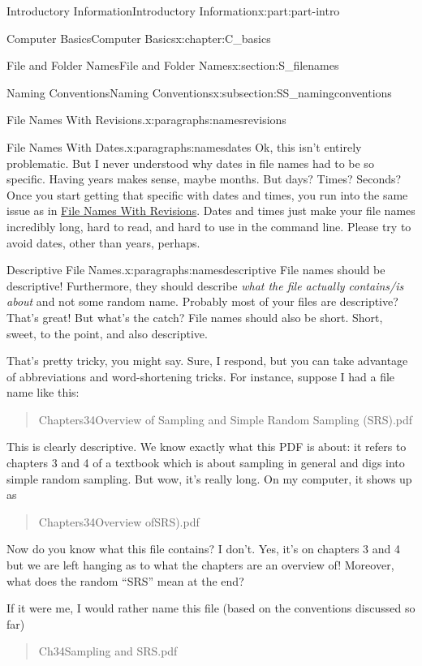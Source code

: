 \documentclass[oneside,10pt,]{book}
\begin{document}
\begin{partptx}{Introductory Information}{}{Introductory Information}{}{}{x:part:part-intro}
\begin{chapterptx}{Computer Basics}{}{Computer Basics}{}{}{x:chapter:C_basics}
\begin{sectionptx}{File and Folder Names}{}{File and Folder Names}{}{}{x:section:S_filenames}
\begin{subsectionptx}{Naming Conventions}{}{Naming Conventions}{}{}{x:subsection:SS_namingconventions}
\begin{paragraphs}{File Names With Revisions.}{x:paragraphs:namesrevisions}
\end{paragraphs}%
\begin{paragraphs}{File Names With Dates.}{x:paragraphs:namesdates}%
%
Ok, this isn't entirely problematic. But I never understood why dates in file names had to be so specific. Having years makes sense, maybe months. But days? Times? Seconds? Once you start getting that specific with dates and times, you run into the same issue as in \hyperlink{x:paragraphs:namesrevisions}{File Names With Revisions}. Dates and times just make your file names incredibly long, hard to read, and hard to use in the command line. Please try to avoid dates, other than years, perhaps.%
\end{paragraphs}%
\begin{paragraphs}{Descriptive File Names.}{x:paragraphs:namesdescriptive}%
%
%
File names should be descriptive! Furthermore, they should describe \emph{what the file actually contains\slash{}is about} and not some random name. Probably most of your files are descriptive? That's great! But what's the catch? File names should also be short. Short, sweet, to the point, and also descriptive.%
\par
That's pretty tricky, you might say. Sure, I respond, but you can take advantage of abbreviations and word-shortening tricks. For instance, suppose I had a file name like this: \begin{quote}%
Chapters3\textunderscore{}4\textunderscore{}Overview of Sampling and Simple Random Sampling (SRS).pdf\end{quote}
 This is clearly descriptive. We know exactly what this PDF is about: it refers to chapters 3 and 4 of a textbook which is about sampling in general and digs into simple random sampling. But wow, it's really long. On my computer, it shows up as \begin{quote}%
Chapters3\textunderscore{}4\textunderscore{}Overview of\textellipsis{}SRS).pdf\end{quote}
 Now do you know what this file contains? I don't. Yes, it's on chapters 3 and 4 but we are left hanging as to what the chapters are an overview of! Moreover, what does the random ``SRS'' mean at the end?%
\par
If it were me, I would rather name this file (based on the conventions discussed so far) \begin{quote}%
Ch3\textunderscore{}4\textunderscore{}Sampling and SRS.pdf\end{quote}

\end{paragraphs}
\end{subsectionptx}
\end{sectionptx}
\end{chapterptx}
\end{partptx}
\end{document}
